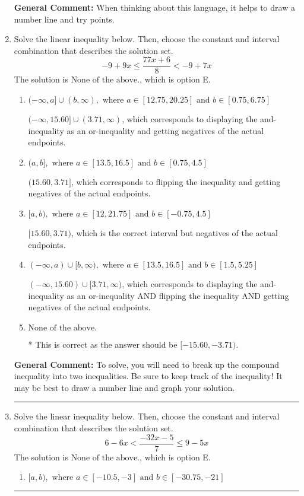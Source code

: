 \documentclass{extbook}[14pt]
\newcommand{\litem}[1]{\item #1

\rule{\textwidth}{0.4pt}}
\begin{document}
\begin{enumerate}
{\textbf{General Comment:} When thinking about this language, it helps to draw a number line and try points.
}
\litem{
Solve the linear inequality below. Then, choose the constant and interval combination that describes the solution set.
\[ -9 + 9 x \leq \frac{77 x + 6}{8} < -9 + 7 x \]The solution is \( \text{None of the above.} \), which is option E.\begin{enumerate}[label=\Alph*.]
\item \( (-\infty, a] \cup (b, \infty), \text{ where } a \in [12.75, 20.25] \text{ and } b \in [0.75, 6.75] \)

$(-\infty, 15.60] \cup (3.71, \infty)$, which corresponds to displaying the and-inequality as an or-inequality and getting negatives of the actual endpoints.
\item \( (a, b], \text{ where } a \in [13.5, 16.5] \text{ and } b \in [0.75, 4.5] \)

$(15.60, 3.71]$, which corresponds to flipping the inequality and getting negatives of the actual endpoints.
\item \( [a, b), \text{ where } a \in [12, 21.75] \text{ and } b \in [-0.75, 4.5] \)

$[15.60, 3.71)$, which is the correct interval but negatives of the actual endpoints.
\item \( (-\infty, a) \cup [b, \infty), \text{ where } a \in [13.5, 16.5] \text{ and } b \in [1.5, 5.25] \)

$(-\infty, 15.60) \cup [3.71, \infty)$, which corresponds to displaying the and-inequality as an or-inequality AND flipping the inequality AND getting negatives of the actual endpoints.
\item \( \text{None of the above.} \)

* This is correct as the answer should be $[-15.60, -3.71)$.
\end{enumerate}

\textbf{General Comment:} To solve, you will need to break up the compound inequality into two inequalities. Be sure to keep track of the inequality! It may be best to draw a number line and graph your solution.
}
\litem{
Solve the linear inequality below. Then, choose the constant and interval combination that describes the solution set.
\[ 6 - 6 x < \frac{-32 x - 5}{7} \leq 9 - 5 x \]The solution is \( \text{None of the above.} \), which is option E.\begin{enumerate}[label=\Alph*.]
\item \( [a, b), \text{ where } a \in [-10.5, -3] \text{ and } b \in [-30.75, -21] \)


\end{enumerate}}
\end{enumerate}
\end{document}

